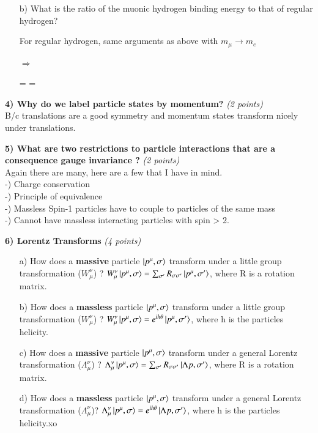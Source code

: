 {\begin{itemize}
Can get E from plugging this back into either of the two terms.

\be
E \sim {} \sim \alpha^2 m_\mu \sim 10^{-4}\ 10^{-1}\ GeV = 10^{-5}\ GeV
\ee

\item[b)] What is the ratio of the muonic hydrogen binding energy to that of regular hydrogen?

For regular hydrogen, same arguments as above with $m_\mu \rightarrow m_e$

$\Rightarrow$

\be
{} =  =  
\ee

\end{itemize}


\textbf{4) Why do we label particle states by momentum? } \hfill \textit{(2 points)}\\

B/c translations are a good symmetry and momentum states transform nicely under translations.



\textbf{5) What are two restrictions to particle interactions that are a consequence gauge invariance ? }\hfill \textit{(2 points)}\\

Again there are many, here are a few that I have in mind.\\
-) Charge conservation\\
-) Principle of equivalence\\
-) Massless Spin-1 particles have to couple to particles of the same mass\\
-) Cannot have massless interacting particles with spin > 2.

\textbf{6) Lorentz Transforms } \hfill \textit{(4 points)}\\
\begin{itemize}
\item[a)] How does a \textbf{massive} particle $\ket{p^\mu,\sigma}$ transform under a little group transformation ($W_\mu^\nu$)  ?
$W_\mu^\nu \ket{p^\mu,\sigma} = \sum_{\sigma'} R_{\sigma \sigma'} \ket{p^\mu,\sigma'}$, where R is a rotation matrix.
\item[b)] How does a \textbf{massless} particle $\ket{p^\mu,\sigma}$ transform under a little group transformation ($W_\mu^\nu$)  ?
$W_\mu^\nu \ket{p^\mu,\sigma} = e^{ih\theta} \ket{p^\mu,\sigma'}$, where h is the particles helicity.
\item[c)] How does a \textbf{massive} particle $\ket{p^\mu,\sigma}$ transform under a general Lorentz transformation ($\Lambda_\mu^\nu$) ?
$\Lambda_\mu^\nu \ket{p^\mu,\sigma} = \sum_{\sigma'} R_{\sigma \sigma'} \ket{\Lambda p,\sigma'}$, where R is a rotation matrix.
\item[d)] How does a \textbf{massless} particle $\ket{p^\mu,\sigma}$ transform under a general Lorentz transformation ($\Lambda_\mu^\nu$)?
$\Lambda_\mu^\nu \ket{p^\mu,\sigma} = e^{ih\theta} \ket{\Lambda p,\sigma'}$, where h is the particles helicity.xo
\end{itemize}


}
